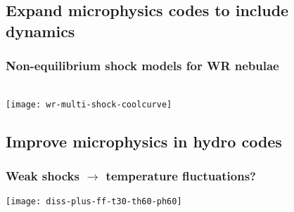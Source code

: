 \documentclass[presentation]{beamer}
\begin{document}
\subsection{Expand microphysics codes to include dynamics}

\begin{frame}
  \frametitle{Non-equilibrium shock models for WR nebulae}
  \centering
  \\
  \texttt{[image: wr-multi-shock-coolcurve]}
\end{frame}



\subsection{Improve microphysics in hydro codes}

\begin{frame}
  \frametitle{Weak shocks \(\to\) temperature fluctuations?}
  \centering\texttt{[image: diss-plus-ff-t30-th60-ph60]}
\end{frame}
\end{document}
